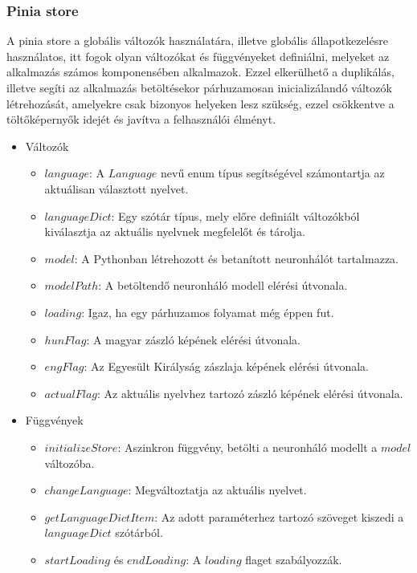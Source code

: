 \subsubsection{Pinia store}
A pinia store a globális változók használatára, illetve globális állapotkezelésre használatos, itt fogok olyan változókat és függvényeket definiálni, melyeket az alkalmazás számos komponensében alkalmazok. Ezzel elkerülhető a duplikálás, illetve segíti az alkalmazás betöltésekor párhuzamosan inicializálandó változók létrehozását, amelyekre csak bizonyos helyeken lesz szükség, ezzel csökkentve a töltőképernyők idejét és javítva a felhasználói élményt.
\begin{itemize}
    \item Változók
    \begin{itemize}
        \item $language$: A $Language$ nevű enum típus segítségével számontartja az aktuálisan választott nyelvet.
        \item $languageDict$: Egy szótár típus, mely előre definiált változókból kiválasztja az aktuális nyelvnek megfelelőt és tárolja.
        \item $model$: A Pythonban létrehozott és betanított neuronhálót tartalmazza.
        \item $modelPath$: A betöltendő neuronháló modell elérési útvonala.
        \item $loading$: Igaz, ha egy párhuzamos folyamat még éppen fut.
        \item $hunFlag$: A magyar zászló képének elérési útvonala.
        \item $engFlag$: Az Egyesült Királyság zászlaja képének elérési útvonala.
        \item $actualFlag$: Az aktuális nyelvhez tartozó zászló képének elérési útvonala.
    \end{itemize}
    \item Függvények
    \begin{itemize}
        \item $initializeStore$: Aszinkron függvény, betölti a neuronháló modellt a $model$ változóba.
        \item $changeLanguage$: Megváltoztatja az aktuális nyelvet.
        \item $getLanguageDictItem$: Az adott paraméterhez tartozó szöveget kiszedi a $languageDict$ szótárból.
        \item $startLoading$ és $endLoading$: A $loading$ flaget szabályozzák.
    \end{itemize}
\end{itemize}

